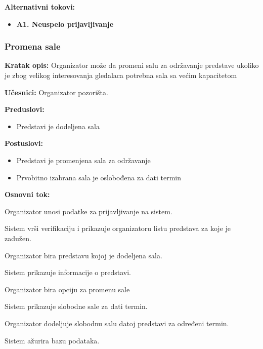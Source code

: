\documentclass[a4paper]{article}
\begin{document}
\noindent\textbf{Alternativni tokovi:} 
\begin{itemize}
 \item \textbf{A1. Neuspelo prijavljivanje} 
  
\end{itemize}


\subsubsection{Promena sale}
\noindent\textbf{Kratak opis:} Organizator može da promeni salu za održavanje predstave ukoliko je zbog velikog interesovanja gledalaca potrebna sala sa većim kapacitetom

\noindent\textbf{Učesnici:} Organizator pozorišta.

\noindent\textbf{Preduslovi:}
  \begin{itemize}
    \item Predstavi je dodeljena sala
  \end{itemize}

\noindent\textbf{Postuslovi:} 
  \begin{itemize}
    \item Predstavi je promenjena  sala za održavanje
    \item Prvobitno izabrana sala je oslobođena za dati termin
  \end{itemize}

\noindent\textbf{Osnovni tok:}
  \begin{legal}
  \item Organizator unosi podatke za prijavljivanje na sistem.
    \item Sistem vrši verifikaciju i prikazuje organizatoru listu predstava za koje je zadužen.
    \item Organizator bira predstavu kojoj je dodeljena sala.
    \item Sistem prikazuje informacije o predstavi.
    \item Organizator bira opciju za promenu sale
    \item Sistem prikazuje slobodne sale za dati termin.
    \item Organizator dodeljuje slobodnu salu datoj predstavi za određeni termin.
     \item Sistem ažurira bazu podataka.
  \end{legal}
\end{document}
